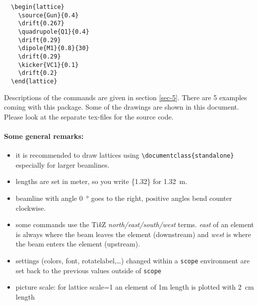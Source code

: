 \documentclass[a4paper]{scrartcl}
\newcommand{\tikzlabel}{Ti\textit{k}Z}
\begin{document}
\begin{minipage}[c]{0.5\textwidth}
\begin{lstlisting}
  \begin{lattice}
    \source{Gun}{0.4}
    \drift{0.267}
    \quadrupole{Q1}{0.4}
    \drift{0.29}
    \dipole{M1}{0.8}{30}
    \drift{0.29}
    \kicker{VC1}{0.1}
    \drift{0.2}   
  \end{lattice}
\end{lstlisting}
\end{minipage}
%
\begin{minipage}[c]{0.5\textwidth}
  \begin{center}
    \begin{lattice}
    \end{lattice}
  \end{center}
\end{minipage}


Descriptions of the commands are given in section \ref{sec-5}. There are 5 examples coming
with this package. Some of the drawings are shown in this document. Please look at the
separate tex-files for the source code.

\paragraph{Some general remarks:}
\begin{itemize}
\item it is recommended to draw lattices using \lstinline+\documentclass{standalone}+
  especially for larger beamlines.
\item lengths are set in meter, so you write \{1.32\} for \SI{1.32}{\m}.
\item beamline with angle \SI{0}{\degree} goes to the right, positive angles bend counter clockwise.
\item some commands use the \tikzlabel{} \textit{north/east/south/west} terms. \textit{east}
  of an element is always where the beam leaves the element (downstream) and \textit{west} is where the
  beam enters the element (upstream).
\item settings (colors, font, rotatelabel,\ldots{}) changed within a \verb+scope+ environment are set back to the previous values outside of \verb+scope+
\item picture scale: for lattice scale=1 an element of 1m length is plotted with \SI{2}{\cm} length
\end{itemize}
\end{document}
